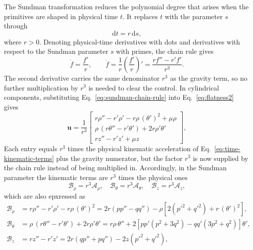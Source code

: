 \documentclass[a4paper,fleqn]{cas-sc}
\begin{document}
The Sundman transformation reduces the polynomial degree that arises when the
primitives are shaped in physical time $t$. It replaces $t$ with the parameter
$s$ through
\begin{equation}
	\mathrm{d}t=r\,\mathrm{d}s,
	\label{eq:sundman-transformation}
\end{equation}
where $r>0$. Denoting physical-time derivatives with dots and derivatives
with respect to the Sundman parameter $s$ with primes, the chain rule gives
\begin{equation}
	\dot f=\frac{f'}{r},
	\qquad
	\ddot f
	=\frac{1}{r}\left(\frac{f'}{r}\right)'
	=\frac{rf''-r'f'}{r^3}.
	\label{eq:sundman-chain-rule}
\end{equation}
The second derivative carries the same denominator $r^3$ as the gravity
term, so no further multiplication by $r^3$ is needed to clear the control.
In cylindrical components, substituting Eq.~\eqref{eq:sundman-chain-rule}
into Eq.~\eqref{eq:flatness2} gives
\begin{equation}
	\mathbf{u}=\dfrac{1}{r^3}\begin{bmatrix}
		r\rho''-r'\rho'-r\rho\,(\theta')^2+\mu\rho\\
		\rho\,(r\theta''-r'\theta')+2r\rho'\theta'\\
		rz''-r'z'+\mu z
	\end{bmatrix},
	\label{eq:sundman-control}
\end{equation}
Each entry equals $r^3$ times the physical
kinematic acceleration of Eq.~\eqref{eq:time-kinematic-terms} plus the
gravity numerator, but the factor $r^3$ is now supplied by the chain rule
instead of being multiplied in. Accordingly, in the Sundman parameter the
kinematic terms are $r^3$ times the physical ones
\begin{equation*}
\mathcal{B}_\rho=r^3\mathcal{A}_\rho,\quad\mathcal{B}_\theta=r^3\mathcal{A}_\theta,\quad \mathcal{B}_z=r^3\mathcal{A}_z,
\end{equation*}
which are also epxressed as
\begin{equation}
	\begin{aligned}
		\mathcal B_\rho
		&=r\rho''-r'\rho'-r\rho\,(\theta')^2
		=2r\left(pp''-qq''\right)
		-\rho\left[2\left(p'^2+q'^2\right)+r\,(\theta')^2\right],\\
		\mathcal B_\theta
		&=\rho\,(r\theta''-r'\theta')+2r\rho'\theta'
		= r\rho\,\theta''
		+2\left[pp'\left(p^2+3q^2\right)-qq'\left(3p^2+q^2\right)\right]\theta',\\
		\mathcal B_z
		&=rz''-r'z'
		= 2r\left(qp''+pq''\right)-2z\left(p'^2+q'^2\right),
	\end{aligned}
	\label{eq:sundman-kinematic-pq}
\end{equation}
\end{document}
